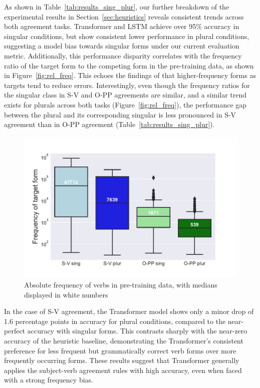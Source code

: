 As shown in Table~\ref{tab:results_sing_plur}, our further breakdown of the experimental results in Section~\ref{sec:heuristics} reveals consistent trends across both agreement tasks.
Transformer and LSTM achieve over 95\% accuracy in singular conditions, but show consistent lower performance in plural conditions, suggesting a model bias towards singular forms under our current evaluation metric. Additionally, this performance disparity correlates with the frequency ratio of the target form to the competing form in the pre-training data, as shown in Figure~\ref{fig:rel_freq}. This echoes the findings of \cite{ambridge2015ubiquity} that higher-frequency forms as targets tend to reduce errors. Interestingly, even though the frequency ratios for the singular class in S-V and O-PP agreements are similar, and a similar trend exists for plurals across both tasks (Figure~\ref{fig:rel_freq}), the performance gap between the plural and its corresponding singular is less pronounced in S-V agreement than in O-PP agreement (Table~\ref{tab:results_sing_plur}).


\begin{figure}[ht]
    \centering
        \includegraphics[width=\textwidth]{figures/abs_freq_s-v_o-pp.pdf}
        \caption{Absolute frequency of \target verbs in pre-training data, with medians displayed in white numbers}
        \label{fig:abs_freq} 
\end{figure}

In the case of S-V agreement, the Transformer model shows only a minor drop of 1.6 percentage points in accuracy for plural conditions, compared to the near-perfect accuracy with singular forms. This contrasts sharply with the near-zero accuracy of the heuristic baseline, demonstrating the Transformer's consistent preference for less frequent but grammatically correct verb forms over more frequently occurring forms. These results suggest that Transformer generally applies the subject-verb agreement rules with high accuracy, even when faced with a strong frequency bias. 

